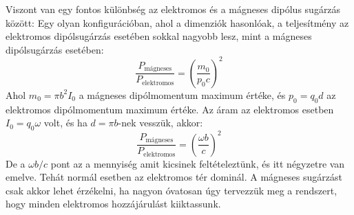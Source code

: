 \documentclass[a4paper,12pt]{article}
\begin{document}
Viszont van egy fontos különbség az elektromos és a mágneses dipólus sugárzás között: Egy olyan konfigurációban, ahol a dimenziók hasonlóak, a teljesítmény az elektromos dipólsugárzás esetében sokkal nagyobb lesz, mint a mágneses dipólsugárzás esetében:
\begin{equation}
    \frac{P_{\text{mágneses}}}{P_{\text{elektromos}}} = \left(\frac{m_0}{p_0c}\right)^2
\end{equation}
Ahol $m_0 = \pi b^2 I_0$ a mágneses dipólmomentum maximum értéke, és $p_0 = q_0 d$ az elektromos dipólmomentum maximum értéke. Az áram az elektromos esetben $I_0 = q_0 \omega$ volt, és ha $d = \pi b$-nek vesszük, akkor:
\begin{equation}
    \frac{P_{\text{mágneses}}}{P_{\text{elektromos}}} = \left(\frac{\omega b}{c}\right)^2
\end{equation}
De a $\omega b / c$ pont az a mennyiség amit kicsinek feltételeztünk, és itt négyzetre van emelve. Tehát normál esetben az elektromos tér dominál. A mágneses sugárzást csak akkor lehet érzékelni,
ha nagyon óvatosan úgy tervezzük meg a rendszert, hogy minden elektromos hozzájárulást kiiktassunk.
\end{document}
